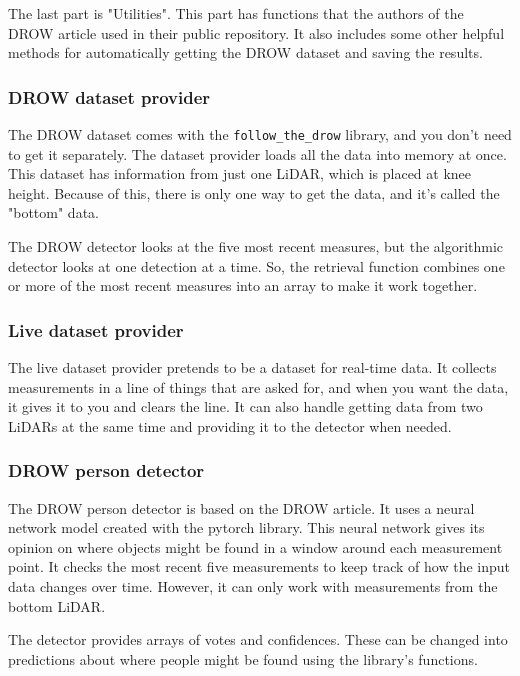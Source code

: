 \documentclass{article}
\begin{document}
The last part is "Utilities".
This part has functions that the authors of the DROW article used in their public repository.
It also includes some other helpful methods for automatically getting the DROW dataset and saving the results.

\subsubsection{DROW dataset provider}


The DROW dataset comes with the \texttt{follow\_the\_drow} library, and you don't need to get it separately.
The dataset provider loads all the data into memory at once. 
This dataset has information from just one LiDAR, which is placed at knee height.
Because of this, there is only one way to get the data, and it's called the "bottom" data.

The DROW detector looks at the five most recent measures, but the algorithmic detector looks at one detection at a time.
So, the retrieval function combines one or more of the most recent measures into an array to make it work together.

\subsubsection{Live dataset provider}

The live dataset provider pretends to be a dataset for real-time data.
It collects measurements in a line of things that are asked for, and when you want the data, it gives it to you and clears the line.
It can also handle getting data from two LiDARs at the same time and providing it to the detector when needed.

\subsubsection{DROW person detector}

The DROW person detector is based on the DROW article\cite{DROW_2018}.
It uses a neural network model created with the pytorch\cite{pytorch_site} library.
This neural network gives its opinion on where objects might be found in a window around each measurement point.
It checks the most recent five measurements to keep track of how the input data changes over time.
However, it can only work with measurements from the bottom LiDAR.

The detector provides arrays of votes and confidences.
These can be changed into predictions about where people might be found using the library's functions.
\end{document}
